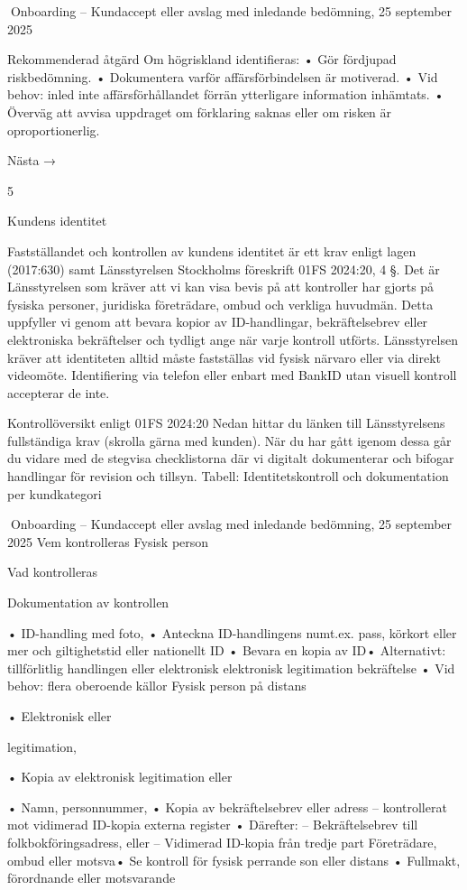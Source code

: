 Onboarding – Kundaccept eller avslag med inledande bedömning,
25 september 2025

Rekommenderad åtgärd
Om högriskland identifieras:
• Gör fördjupad riskbedömning.
• Dokumentera varför affärsförbindelsen är motiverad.
• Vid behov: inled inte affärsförhållandet förrän ytterligare information inhämtats.
• Överväg att avvisa uppdraget om förklaring saknas eller om risken är oproportionerlig.

Nästa →

5

Kundens identitet

Fastställandet och kontrollen av kundens identitet är ett krav enligt lagen (2017:630) samt
Länsstyrelsen Stockholms föreskrift 01FS 2024:20, 4 §.
Det är Länsstyrelsen som kräver att vi kan visa bevis på att kontroller har gjorts på
fysiska personer, juridiska företrädare, ombud och verkliga huvudmän. Detta uppfyller vi
genom att bevara kopior av ID-handlingar, bekräftelsebrev eller elektroniska bekräftelser
och tydligt ange när varje kontroll utförts.
Länsstyrelsen kräver att identiteten alltid måste fastställas vid fysisk närvaro eller via
direkt videomöte. Identifiering via telefon eller enbart med BankID utan visuell kontroll
accepterar de inte.

Kontrollöversikt enligt 01FS 2024:20
Nedan hittar du länken till Länsstyrelsens fullständiga krav (skrolla gärna med kunden).
När du har gått igenom dessa går du vidare med de stegvisa checklistorna där vi digitalt
dokumenterar och bifogar handlingar för revision och tillsyn.
Tabell: Identitetskontroll och dokumentation per kundkategori

Onboarding – Kundaccept eller avslag med inledande bedömning,
25 september 2025
Vem kontrolleras
Fysisk person

Vad kontrolleras

Dokumentation av kontrollen

• ID-handling med foto, • Anteckna ID-handlingens numt.ex. pass, körkort eller
mer och giltighetstid eller
nationellt ID
• Bevara en kopia av ID• Alternativt:
tillförlitlig
handlingen eller elektronisk
elektronisk legitimation
bekräftelse
• Vid behov: flera oberoende
källor
Fysisk person på distans

• Elektronisk
eller

legitimation,

• Kopia av elektronisk legitimation eller

• Namn,
personnummer, • Kopia av bekräftelsebrev eller
adress – kontrollerat mot
vidimerad ID-kopia
externa register
• Därefter:
– Bekräftelsebrev till folkbokföringsadress, eller
– Vidimerad
ID-kopia
från tredje part
Företrädare, ombud eller motsva• Se kontroll för fysisk perrande
son eller distans
• Fullmakt, förordnande eller motsvarande

